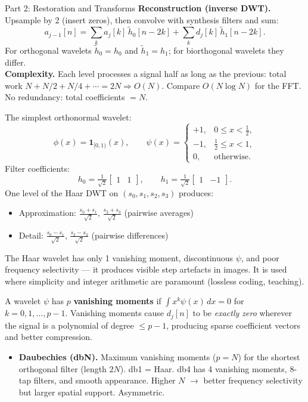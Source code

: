 \documentclass[letterpaper]{article}
\begin{document}
\begin{notes}{Part 2: Restoration and Transforms}
\textbf{Reconstruction (inverse DWT).} Upsample by 2 (insert zeros), then convolve with synthesis filters and sum:
$$a_{j-1}[n] = \sum_k a_j[k]\,\tilde{h}_0[n-2k] + \sum_k d_j[k]\,\tilde{h}_1[n-2k].$$
For orthogonal wavelets $\tilde{h}_0 = h_0$ and $\tilde{h}_1 = h_1$; for biorthogonal wavelets they differ.\\

\textbf{Complexity.} Each level processes a signal half as long as the previous: total work $N + N/2 + N/4 + \cdots = 2N \Rightarrow O(N)$. Compare $O(N\log N)$ for the FFT. No redundancy: total coefficients $= N$.


The simplest orthonormal wavelet:
$$\phi(x) = \mathbf{1}_{[0,1)}(x), \qquad \psi(x) = \begin{cases}+1, & 0\le x < \tfrac{1}{2},\\ -1, & \tfrac{1}{2}\le x < 1,\\ 0, & \text{otherwise.}\end{cases}$$
Filter coefficients:
$$h_0 = \tfrac{1}{\sqrt{2}}\begin{bmatrix}1&1\end{bmatrix}, \qquad h_1 = \tfrac{1}{\sqrt{2}}\begin{bmatrix}1&-1\end{bmatrix}.$$
One level of the Haar DWT on $(s_0,s_1,s_2,s_3)$ produces:
\begin{itemize}
    \item Approximation: $\frac{s_0+s_1}{\sqrt{2}},\,\frac{s_2+s_3}{\sqrt{2}}$ (pairwise averages)
    \item Detail: $\frac{s_0-s_1}{\sqrt{2}},\,\frac{s_2-s_3}{\sqrt{2}}$ (pairwise differences)
\end{itemize}
The Haar wavelet has only 1 vanishing moment, discontinuous $\psi$, and poor frequency selectivity — it produces visible step artefacts in images. It is used where simplicity and integer arithmetic are paramount (lossless coding, teaching).


A wavelet $\psi$ has $p$ \textbf{vanishing moments} if $\int x^k\psi(x)\,dx = 0$ for $k=0,1,\ldots,p-1$. Vanishing moments cause $d_j[n]$ to be \emph{exactly zero} wherever the signal is a polynomial of degree $\le p-1$, producing sparse coefficient vectors and better compression.

\begin{itemize}
    \item \textbf{Daubechies (dbN).} Maximum vanishing moments ($p=N$) for the shortest orthogonal filter (length $2N$). db1 = Haar. db4 has 4 vanishing moments, 8-tap filters, and smooth appearance. Higher $N$ $\to$ better frequency selectivity but larger spatial support. Asymmetric.


\end{itemize}
\end{notes}
\end{document}
